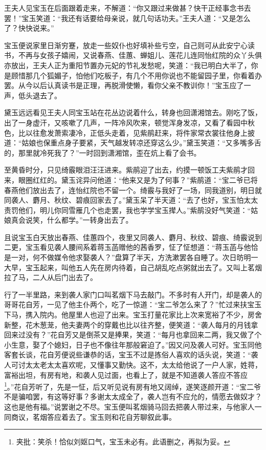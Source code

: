 \documentclass[12pt,oneside]{book}
\begin{document}
王夫人见宝玉在后面跟着走来，不解道：“你又跟过来做甚？快干正经事念书去罢！”宝玉笑道：“我还有话要给母亲说，就几句话功夫。”王夫人道：“又是怎么了？快快说来。”

宝玉便说家里日渐穷蹇，放走一些奴仆也好填补些亏空，自己则可从此安宁心读书，不再与女孩子嬉闹，又说春燕、佳蕙、蝉姐儿、莲花儿连同怡红院的众丫头俱亦放出，王夫人正为重阳节置办元妃的节礼发愁呢，笑道：“我已明白大半了，你是顾惜那几个狐媚子，怕他们吃板子，有几个不用你说也不能留园子里，你看着办罢。从今以后认真读书是正理，再脱滑使懒，看你父亲不教训你！”宝玉应了一声，低头退去了。

黛玉远远看见王夫人同宝玉站在花丛边说着什么，转身也回潇湘馆去。刚吃了饭，出了一身虚汗，又咳嗽了几声，一阵冷风吹来，顿觉浑身发凉，又看了看园中秋色，比以往愈发萧索凄冷，正低头走着，见紫鹃赶来，将件家常衣裳往他身上披道：“姑娘也保重点身子要紧，天气越发转凉还穿这么少。”黛玉笑道：“又多嘴多舌的，那里就冷死我了？”一时回到潇湘馆，歪在炕上看了会书。

至黄昏时分，只见绮霰眼泪汪汪进来。紫鹃迎了出去，约摸一顿饭工夫紫鹃才回来，眼圈红红的。黛玉诧异问他道：“他来又是为了何事？”紫鹃道：“宝二爷已将春燕他们放出去了，连怡红院也不留一个。绮霰与我好了一场，同我道别，明日就同袭人、麝月、秋纹、碧痕回家去了。”黛玉呆了半天道：“去了也好，宝玉怕太太责罚他们，明儿你同雪雁几个也走罢，我也学学宝玉撵人。”紫鹃没好气笑道：“姑娘真会说笑，什么都学。”一转身出去了。

且说宝玉白天放出春燕、佳蕙四个，夜里又同袭人、麝月、秋纹、碧痕、绮霰说到二更，宝玉看见袭人腰间系着蒋玉菡赠他的茜香罗，怔了怔想道：“蒋玉菡与他恰是一对，何不做媒令他求娶袭人？”盘算了半天，方洗漱罢各自睡了。次日昉明一大早，宝玉起来，叫他五人先在房内待着，自己胡乱吃点粥就出去了。又叫上茗烟拉了马，二人从后门出去了。

行了一半里路，来到袭人家门口叫茗烟下马去敲门。不多时有人开门，却是袭人的哥哥花自芳，一见了他主仆两个，吃了一惊道：“宝二爷怎么来了？”忙过来扶宝玉下马，携入院内。他屋里人也迎了出来。宝玉打量花家比上次来宽裕了不少，房舍新整，花木葱茏，他夫妻两个的穿戴也比以往齐整，便笑道：“袭人每月的月钱拿回来过没有？”花自芳又是倒茶又是捧果，笑道：“每月也拿回来二两，我又做了个小生意，娶了个媳妇，日子也不像往年那般窘迫了。”因又问及袭人可好。宝玉同他客套长谈，花自芳便说些谦恭的话，宝玉不过是拣俗人喜欢的话头说，笑道：“袭人可讨太太老太太喜欢呢，又懂事又勤快。这不，太太给他说了一户人家，姓蒋，富裕出坦，有房有地，和袭人见过面，也看上了，就是不知道袭人答应不答应\footnote{夹批：笑杀！恰似刘妪口气，宝玉未必有。此语删之，再拟为妥。}。”花自芳听了，先是一怔，后又听见说有房有地又阔绰，遂笑逐颜开道：“宝二爷不是骗咱罢，有这等好事？多谢太太成全了，袭人岂有不应允的，情愿去做奴才？这也是他有福。”说罢谢之不尽。宝玉便叫茗烟骑马回去把袭人带过来，与他家人一同商议，茗烟答应着去了。宝玉则和花自芳聊叙此事。
\end{document}
